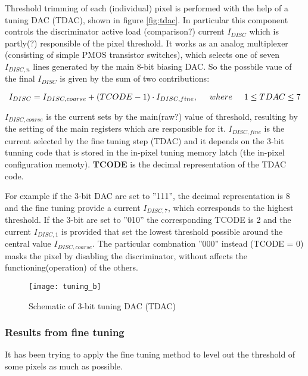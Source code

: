 Threshold trimming of each (individual) pixel is performed with the help of a tuning DAC (TDAC), shown in figure \vref{fig:tdac}. In particular this component controls the discriminator active load (comparison?) current $I_{DISC}$ which is partly(?) responsible of the pixel threshold. It works as an analog multiplexer (consisting of simple PMOS transistor switches), which selects one of seven $I_{DISC, n}$ lines generated by the main 8-bit biasing DAC. So the possbile vaue of the final $I_{DISC}$ is given by the sum of two contributions:

\begin{equation}
I_{DISC} = I_{DISC, coarse} + (TCODE - 1) \cdot I_{DISC,fine},  \hspace{.5cm}	where \hspace{.5cm} 1 \leq TDAC \leq 7
\end{equation}

\textbf{$I_{DISC, coarse}$} is the current sets by the main(raw?) value of threshold, resulting by the setting of the main registers which are responsible for it. 
\textbf{$I_{DISC, fine}$} is the current selected by the fine tuning step (TDAC) and it depends on the 3-bit tunning code that is stored in the in-pixel tuning memory latch (the in-pixel configuration memoty).
\textbf{TCODE} is the decimal representation of the TDAC code. 

For example if the 3-bit DAC are set to ''111'', the decimal representation is 8 and the fine tuning provide a current $I_{DISC,7}$, which corresponds to the highest threshold. If the 3-bit are set to ''010'' the corresponding TCODE is 2 and the current $I_{DISC,1}$ is provided that set the lowest threshold possible around the central value $I_{DISC,coarse}$. The particular combnation ''000'' instead (TCODE = 0) masks the pixel by disabling the discriminator, without affects the functioning(operation) of the others.

\begin{figure}
\centering
\texttt{[image: tuning\_b]}
\caption{Schematic of 3-bit tuning DAC (TDAC)}
\label{fig:tdac}
\end{figure}

\subsubsection{Results from fine tuning}

It has been trying to apply the fine tuning method to level out the threshold of some pixels as much as possible. \\

